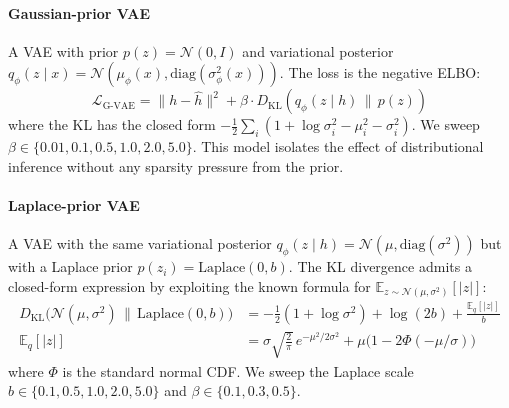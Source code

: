 \documentclass{article}
\begin{document}
\paragraph{Gaussian-prior VAE}
A VAE with prior $p(z) = \mathcal{N}(0, I)$ and variational posterior $q_\phi(z \mid x) = \mathcal{N}(\mu_\phi(x), \text{diag}(\sigma^2_\phi(x)))$. The loss is the negative ELBO:
\begin{equation}
\mathcal{L}_{\text{G-VAE}} = \|h - \hat{h}\|^2 + \beta \cdot D_\text{KL}(q_\phi(z \mid h) \,\|\, p(z))
\label{eq:gvae}
\end{equation}
where the KL has the closed form $-\frac{1}{2}\sum_i(1 + \log\sigma_i^2 - \mu_i^2 - \sigma_i^2)$. We sweep $\beta \in \{0.01, 0.1, 0.5, 1.0, 2.0, 5.0\}$. This model isolates the effect of distributional inference without any sparsity pressure from the prior.

\paragraph{Laplace-prior VAE}
A VAE with the same variational posterior $q_\phi(z \mid h) = \mathcal{N}(\mu, \text{diag}(\sigma^2))$ but with a Laplace prior $p(z_i) = \text{Laplace}(0, b)$. The KL divergence admits a closed-form expression by exploiting the known formula for $\mathbb{E}_{z \sim \mathcal{N}(\mu,\sigma^2)}[|z|]$:
\begin{align}
D_\text{KL}\bigl(\mathcal{N}(\mu,\sigma^2) \,\|\, \text{Laplace}(0,b)\bigr)
  &= -\tfrac{1}{2}(1 + \log\sigma^2) + \log(2b) + \frac{\mathbb{E}_q[|z|]}{b} \label{eq:laplace_kl} \\
\mathbb{E}_q[|z|] &= \sigma\sqrt{\tfrac{2}{\pi}}\,e^{-\mu^2/2\sigma^2}
  + \mu\bigl(1 - 2\Phi(-\mu/\sigma)\bigr) \label{eq:abs_z}
\end{align}
where $\Phi$ is the standard normal CDF. We sweep the Laplace scale $b \in \{0.1, 0.5, 1.0, 2.0, 5.0\}$ and $\beta \in \{0.1, 0.3, 0.5\}$. 
\end{document}
